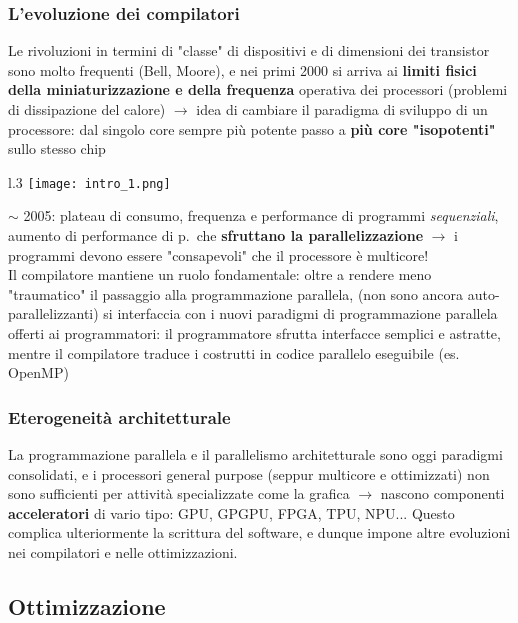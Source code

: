 \subsubsection{L'evoluzione dei compilatori}

Le rivoluzioni in termini di "classe" di dispositivi e di dimensioni dei transistor sono molto frequenti (Bell, Moore), e nei primi 2000 si arriva ai \textbf{limiti fisici della miniaturizzazione e della frequenza} operativa dei processori (problemi di dissipazione del calore) $\rightarrow$ idea di cambiare il paradigma di sviluppo di un processore: dal singolo core sempre pi\`u potente passo a \textbf{pi\`u core "isopotenti"} sullo stesso chip
\begin{wrapfigure}{l}{.3\textwidth}
  \centering
  \texttt{[image: intro\_1.png]}
\end{wrapfigure}

\noindent$\sim$ 2005: plateau di consumo, frequenza e performance di programmi \textit{sequenziali}, aumento di performance di p.~che \textbf{sfruttano la parallelizzazione} $\rightarrow$ i programmi devono essere "consapevoli" che il processore \`e multicore!\\
Il compilatore mantiene un ruolo fondamentale: oltre a rendere meno "traumatico" il passaggio alla programmazione parallela, (non sono ancora auto-parallelizzanti) si interfaccia con i nuovi paradigmi di programmazione parallela offerti ai programmatori: il programmatore sfrutta interfacce semplici e astratte, mentre il compilatore traduce i costrutti in codice parallelo eseguibile (es. OpenMP)

\subsubsection{Eterogeneit\`a architetturale}

La programmazione parallela e il parallelismo architetturale sono oggi paradigmi consolidati, e i processori general purpose (seppur multicore e ottimizzati) non sono sufficienti per attivit\`a specializzate come la grafica $\rightarrow$ nascono componenti \textbf{acceleratori} di vario tipo: GPU, GPGPU, FPGA, TPU, NPU...
Questo complica ulteriormente la scrittura del software, e dunque impone altre evoluzioni nei compilatori e nelle ottimizzazioni.

\subsection{Ottimizzazione}

